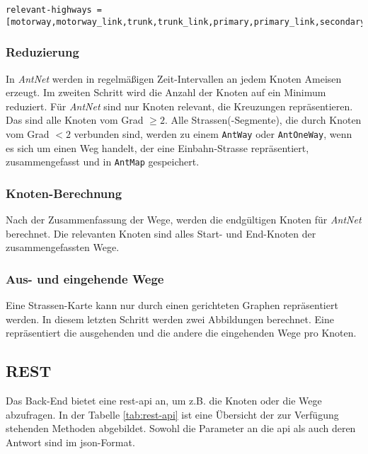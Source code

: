 \begin{lstlisting}
relevant-highways = [motorway,motorway_link,trunk,trunk_link,primary,primary_link,secondary,tertiary]
\end{lstlisting}

\subsubsection{Reduzierung}
\label{sec:reduzierung}

In \textit{AntNet} werden in regelmäßigen Zeit-Intervallen an jedem Knoten Ameisen erzeugt.
Im zweiten Schritt wird die Anzahl der Knoten auf ein Minimum reduziert.
Für \textit{AntNet} sind nur Knoten relevant, die Kreuzungen repräsentieren.
Das sind alle Knoten vom Grad $\geq 2$.
Alle Strassen(-Segmente), die durch Knoten vom Grad $< 2$ verbunden sind, werden zu einem \texttt{AntWay} oder \texttt{AntOneWay}, wenn es sich um einen Weg handelt, der eine Einbahn-Strasse repräsentiert, zusammengefasst und in \texttt{AntMap} gespeichert.

\subsubsection{Knoten-Berechnung}
\label{sec:knoten-berechnung}

Nach der Zusammenfassung der Wege, werden die endgültigen Knoten für \textit{AntNet} berechnet.
Die relevanten Knoten sind alles Start- und End-Knoten der zusammengefassten Wege.

\subsubsection{Aus- und eingehende Wege}
\label{sec:aus-und-eingehende-wege}

Eine Strassen-Karte kann nur durch einen gerichteten Graphen repräsentiert werden.
In diesem letzten Schritt werden zwei Abbildungen berechnet.
Eine repräsentiert die ausgehenden und die andere die eingehenden Wege pro Knoten.

\subsection{REST}
\label{sec:rest}

Das Back-End bietet eine \gls{rest}-\gls{api} an, um z.B. die Knoten oder die Wege abzufragen.
In der Tabelle \ref{tab:rest-api} ist eine Übersicht der zur Verfügung stehenden Methoden abgebildet.
Sowohl die Parameter an die \gls{api} als auch deren Antwort sind im \gls{json}-Format.

